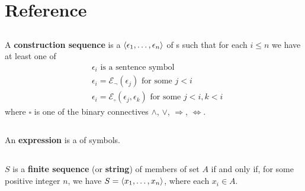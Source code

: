 \documentclass{report}
\begin{document}

\tableofcontents

\begingroup
\renewcommand\thechapter{R}

\chapter{Reference}%

\section{}%

  A \textbf{construction sequence} is a 
    $\left< \epsilon_1, \ldots, \epsilon_n \right>$ of s such that for
    each $i \leq n$ we have at least one of
    \begin{align*}
      & \epsilon_i \text{ is a sentence symbol} \\
      & \epsilon_i = \mathcal{E}_\neg(\epsilon_j) \text{ for some } j < i \\
      & \epsilon_i = \mathcal{E}_\square(\epsilon_j, \epsilon_k)
        \text{ for some } j < i, k < i
    \end{align*}
    where $\square$ is one of the binary connectives $\land$, $\lor$,
      $\Rightarrow$, $\Leftrightarrow$.

\section{}%

  An \textbf{expression} is a  of symbols.

\section{}%

  $S$ is a \textbf{finite sequence} (or \textbf{string}) of members of set $A$
    if and only if, for some positive integer $n$, we have
    $S = \left< x_1, \ldots, x_n \right>$, where each $x_i \in A$.

\section{}%
\end{document}

